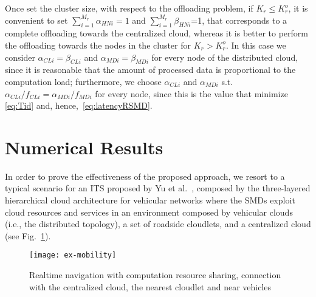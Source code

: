 \documentclass[twoside,openright]{report}
\begin{document}
Once set the cluster size, with respect to the offloading problem, if $K_r\le{K}^o_{r}$, it is convenient to set $\sum_{i=1}^{M_r}{\alpha_\textit{HNi}}=1$ and $\sum_{i=1}^{M_r}\beta_\textit{HNi}$=1, that corresponds to a complete offloading towards the centralized cloud, whereas it is better to perform the offloading towards the nodes in the cluster for $K_r>{K}^o_{r}$. 
In this case we consider $\alpha_\textit{CLi} =\beta_\textit{CLi}$ and $\alpha_\textit{MDi}=\beta_\textit{MDi} $ for every node of the distributed cloud, since it is reasonable that the amount of processed data is proportional to the computation load; furthermore, we choose $\alpha_\textit{CLi}$ and $\alpha_\textit{MDi}$ s.t. $\alpha_\textit{CLi}/f_\textit{CLi} = \alpha_\textit{MDi} / f_\textit{MDi}$ for every node, since this is the value that minimize \autoref{eq:Tid} and, hence,~\autoref{eq:latencyRSMD}.






























\section{Numerical Results}
\label{sec:cases}
In order to prove the effectiveness of the proposed approach, we resort to a typical scenario for an \gls{ITS} proposed by Yu et al.~\cite{Vehicular}, composed by the three-layered hierarchical cloud architecture for vehicular networks where the \glspl{SMD}  exploit cloud resources and services in an environment  composed by vehicular clouds (i.e., the distributed topology), a set of roadside cloudlets, and a centralized cloud (see Fig.~\ref{fig:ex-mobility-dc}). 

\begin{figure}[htbp]
\centering
\texttt{[image: ex-mobility]}
\caption{Realtime navigation with computation resource sharing, connection with the centralized cloud, the nearest cloudlet and near vehicles}
\label{fig:ex-mobility-dc}
\end{figure}
\end{document}
